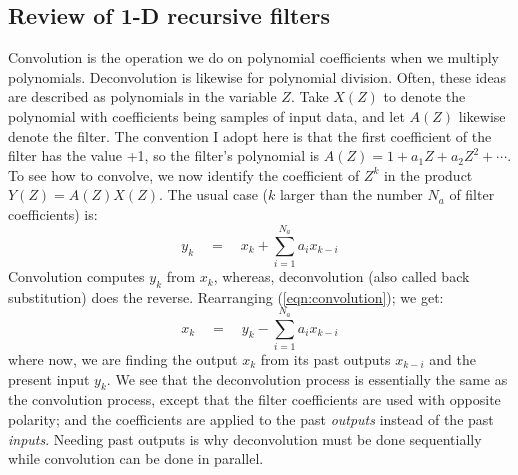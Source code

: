 \subsection{Review of 1-D recursive filters}
Convolution is the operation we do on polynomial coefficients
when we multiply polynomials.
Deconvolution is likewise for polynomial division.
Often, these ideas are described
as polynomials in the variable $Z$.
Take $X(Z)$ to denote the polynomial
with coefficients being samples of input data,
and let $A(Z)$ likewise denote the filter.
The convention I adopt here is that the first coefficient
of the filter has the value +1, so the filter's polynomial
is $A(Z) = 1 + a_1Z + a_2Z^2 + \cdots$.
To see how to convolve, we now identify the coefficient
of $Z^k$ in the product $Y(Z)=A(Z)X(Z)$.
The usual case ($k$ larger than the number $N_a$ of filter coefficients) is:
\begin{equation}
y_k \quad=\quad x_k + \sum_{i=1}^{N_a} a_i x_{k-i}
\label{eqn:convolution}
\end{equation}
Convolution computes $y_k$ from $x_k$, whereas, deconvolution
(also called back substitution) does the reverse.
Rearranging (\ref{eqn:convolution}); we get:
\begin{equation}
x_k \quad=\quad y_k - \sum_{i=1}^{N_a} a_i x_{k-i}
\label{eqn:deconvolution}
\end{equation}
where now, we are finding the output $x_k$ from 
its past outputs $x_{k-i}$ and the present input $y_k$.
We see that the deconvolution process is essentially
the same as the convolution process,
except that the filter coefficients
are used with opposite polarity;
and the coefficients are applied to the past {\em  outputs}
instead of the past {\em  inputs}.
Needing past outputs is why deconvolution must be done sequentially
while convolution can be done in parallel.




